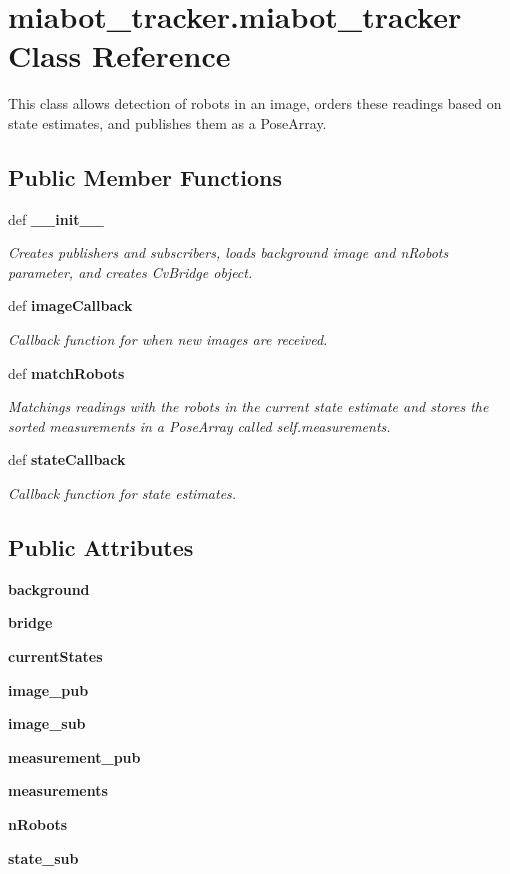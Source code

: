 \section{miabot\-\_\-tracker.\-miabot\-\_\-tracker \-Class \-Reference}
\label{classmiabot__tracker_1_1miabot__tracker}


\-This class allows detection of robots in an image, orders these readings based on state estimates, and publishes them as a \-Pose\-Array.  


\subsection*{\-Public \-Member \-Functions}
\begin{DoxyCompactItemize}
\item 
def {\bf \-\_\-\-\_\-init\-\_\-\-\_\-}
\begin{DoxyCompactList}\small\item\em \-Creates publishers and subscribers, loads background image and n\-Robots parameter, and creates \-Cv\-Bridge object. \end{DoxyCompactList}\item 
def {\bf image\-Callback}
\begin{DoxyCompactList}\small\item\em \-Callback function for when new images are received. \end{DoxyCompactList}\item 
def {\bf match\-Robots}
\begin{DoxyCompactList}\small\item\em \-Matchings readings with the robots in the current state estimate and stores the sorted measurements in a \-Pose\-Array called self.\-measurements. \end{DoxyCompactList}\item 
def {\bf state\-Callback}
\begin{DoxyCompactList}\small\item\em \-Callback function for state estimates. \end{DoxyCompactList}\end{DoxyCompactItemize}
\subsection*{\-Public \-Attributes}
\begin{DoxyCompactItemize}
\item 
{\bf background}
\item 
{\bf bridge}
\item 
{\bf current\-States}
\item 
{\bf image\-\_\-pub}
\item 
{\bf image\-\_\-sub}
\item 
{\bf measurement\-\_\-pub}
\item 
{\bf measurements}
\item 
{\bf n\-Robots}
\item 
{\bf state\-\_\-sub}
\end{DoxyCompactItemize}


